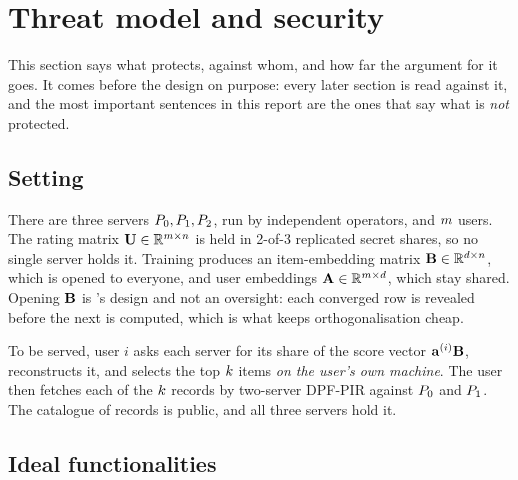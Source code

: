 \section{Threat model and security}
\label{sec:threat}

This section says what \sys{} protects, against whom, and how far the argument
for it goes. It comes before the design on purpose: every later section is read
against it, and the most important sentences in this report are the ones that
say what is \emph{not} protected.

\subsection{Setting}
\label{sec:threat:setting}

There are three servers $P_{0}, P_{1}, P_{2}$, run by independent
operators, and $m$ users. The rating matrix $\mathbf{U} \in \mathbb{R}^{m \times
n}$ is held in 2-of-3 replicated secret shares, so no single server holds
it. Training produces an item-embedding matrix $\mathbf{B} \in \mathbb{R}^{d \times
n}$, which is opened to everyone, and user embeddings $\mathbf{A} \in
\mathbb{R}^{m \times d}$, which stay shared. Opening $\mathbf{B}$ is
\nudgeplain{}'s design and not an oversight: each converged row is revealed
before the next is computed, which is what keeps orthogonalisation cheap.

To be served, user $i$ asks each server for its share of the score vector
$\mathbf{a}^{(i)}\mathbf{B}$, reconstructs it, and selects the top $k$ items
\emph{on the user's own machine}. The user then fetches each of the $k$
records by two-server DPF-PIR against $P_{0}$ and $P_{1}$. The catalogue
of records is public, and all three servers hold it.

\subsection{Ideal functionalities}
\label{sec:threat:ideal}

